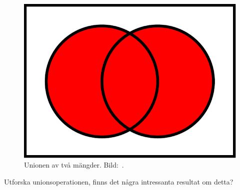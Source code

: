\begin{figure}
\begin{minipage}{0.3\textwidth}
    \includegraphics[width=\textwidth]{figs/union.pdf}
  \end{minipage}
  \caption{%
    Unionen av två mängder.
    Bild:~\cite{Wikipedia2013Set}.
  }\label{fig:Union}
\end{figure}

\begin{exercise}
  Utforska unionsoperationen, finns det några intressanta resultat om detta?
\end{exercise}

